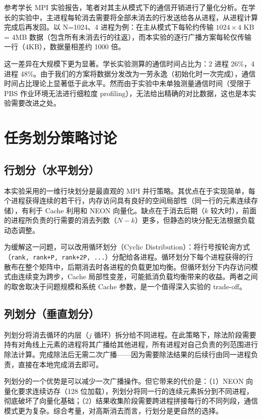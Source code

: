 \documentclass[a4paper]{article}
\begin{document}
参考学长 MPI 实验报告，笔者对其主从模式下的通信开销进行了量化分析。在学长的实验中，主进程每轮消去需要将全部未消去的行发送给各从进程，从进程计算完成后再发回。以 N=1024、4 进程为例：在主从模式下每轮约传输 $1024 \times 4$ KB = 4MB 数据（包含所有未消去行的往返），而本实验的逐行广播方案每轮仅传输一行（4KB），数据量相差约 1000 倍。

这一差异在大规模下更为显著。学长实验测算的通信时间占比为：2 进程 26\%，4 进程 48\%。由于我们的方案将数据分发改为一劳永逸（初始化时一次完成），通信时间占比理论上显著低于此水平。然而由于实验中未单独测量通信时间（受限于 PBS 作业环境无法进行细粒度 profiling），无法给出精确的对比数据，这也是本实验需要改进之处。

\section{任务划分策略讨论}

\subsection{行划分（水平划分）}

本实验采用的一维行块划分是最直观的 MPI 并行策略。其优点在于实现简单，每个进程获得连续的若干行，内存访问具有良好的空间局部性（同一行的元素连续存储），有利于 Cache 利用和 NEON 向量化。缺点在于消去后期（$k$ 较大时），前面的进程所负责的行需要的消去列数（$N-k$）更多，但静态的块分配无法根据负载动态调整。

为缓解这一问题，可以改用循环划分（Cyclic Distribution）：将行号按轮询方式（\texttt{rank, rank+P, rank+2P, ...}）分配给各进程。循环划分下每个进程获得的行散布在整个矩阵中，后期消去时各进程的负载更加均衡。但循环划分下内存访问模式由连续变为跨步，Cache 局部性变差，可能抵消负载均衡带来的收益。两者之间的取舍取决于问题规模和系统 Cache 参数，是一个值得深入实验的 trade-off。

\subsection{列划分（垂直划分）}

列划分将消去循环的内层（$j$ 循环）拆分给不同进程。在此策略下，除法阶段需要持有对角线上元素的进程将其广播给其他进程，所有进程对自己负责的列范围进行除法计算。完成除法后无需二次广播——因为需要除法结果的后续行由同一进程负责，直接在本地完成消去即可。

列划分的一个优势是可以减少一次广播操作。但它带来的代价是：（1）NEON 向量化要求连续访存（128 位加载），列划分将同一行的连续元素拆分到不同进程，彻底破坏了向量化基础；（2）结果收集阶段需要跨进程拼接每行的不同列段，通信模式更为复杂。综合考量，对高斯消去而言，行划分是更自然的选择。
\end{document}
